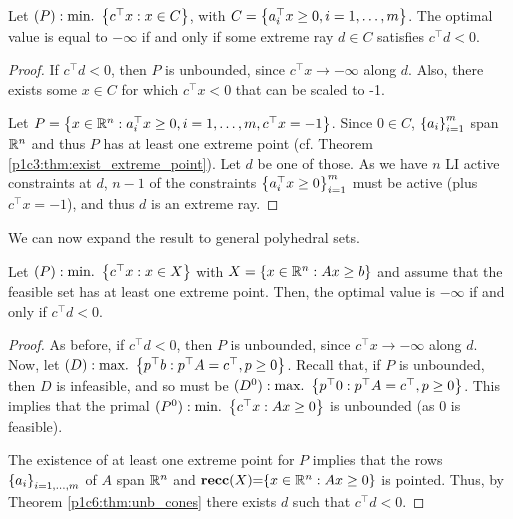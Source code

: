 \begin{theorem}\label{p1c6:thm:unb_cones}
	Let $(P) : \mathop{\text{min.~}}\left\{ c^\top x : x \in C \right \}$, with $C = \left\{ a_i^\top x \geq 0, i = 1,\dots,m \right \}$. The optimal value is equal to $-\infty$ if and only if some extreme ray $d \in C$ satisfies $c^\top d < 0$.
\end{theorem}

\begin{proof}
	If $c^\top d < 0$, then $P$ is unbounded, since $c^\top x \rightarrow -\infty$ along $d$. Also, there exists some $x \in C$ for which $c^\top x < 0$ that can be scaled to -1.
	
	Let $P = \left\{ x \in \mathbb{R}^n : a_i^\top x \geq 0, i =1,\dots,m , c^\top x = -1 \right \}$. Since $0 \in C$, $\left\{ a_i \right \}_{i=1}^m$ span $\mathbb{R}^n$ and thus $P$ has at least one extreme point (cf. Theorem \ref{p1c3:thm:exist_extreme_point}). Let $d$ be one of those. As we have $n$ LI active constraints at $d$, $n-1$ of the constraints $\left\{ a_i^\top x \geq 0 \right \}_{i =1}^m$ must be active (plus $c^\top x = -1$), and thus $d$ is an extreme ray.
\end{proof}

We can now expand the result to general polyhedral sets.

\begin{theorem} 
	Let $(P) : \mathop{\text{min.~}}\left\{ c^\top x : x \in X \right \}$ with $X = \left\{ x \in \mathbb{R}^n : Ax \geq b \right \}$ and assume that the feasible set has at least one extreme point. Then, the optimal value is $-\infty$ if and only if $c^\top d < 0$.  	
\end{theorem}

\begin{proof}
	As before, if $c^\top d < 0$, then $P$ is unbounded, since $c^\top x \rightarrow -\infty$ along $d$. Now, let 
	$(D) : \mathop{\text{max.~}} \left\{ p^\top b : p^\top A = c^\top, p \ge 0 \right \}$. Recall that, if $P$ is unbounded, then $D$ is infeasible, and so must be $(D^0) : \mathop{\text{max.~}} \left\{ p^\top 0 : p^\top A = c^\top, p \ge 0 \right \}$. This implies that the primal $(P^0) : \mathop{\text{min.~}} \left\{ c^\top x : Ax \geq 0 \right \}$ is unbounded (as 0 is feasible).
			
	The existence of at least one extreme point for $P$ implies that the rows $\left\{ a_i \right \}_{i=1,\dots,m}$ of $A$ span $\mathbb{R}^n$ and  ${\bf recc}(X) \hspace{-3pt} =  \hspace{-3pt}\left\{ x \in \mathbb{R}^n : Ax \geq 0 \right \}$ is pointed. Thus, by Theorem \ref{p1c6:thm:unb_cones} there exists $d$ such that $c^\top d < 0$. \qedhere
\end{proof}

